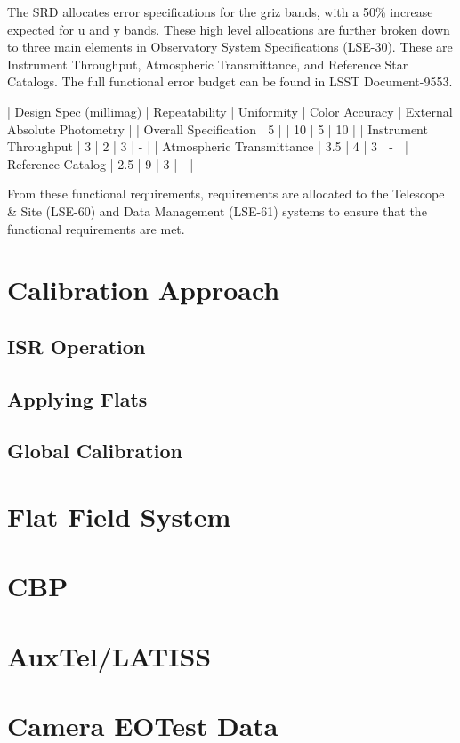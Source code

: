 \documentclass[SE,authoryear,toc]{article}
\begin{document}
The SRD allocates error specifications for the griz bands, with a 50\% increase expected for u and y bands. These high level allocations are further broken down to three main elements in Observatory System Specifications (LSE-30). These are Instrument Throughput, Atmospheric Transmittance, and Reference Star Catalogs. The full functional error budget can be found in LSST Document-9553.

\begin{table}[|||]
| Design Spec (millimag) | Repeatability | Uniformity | Color Accuracy | External Absolute Photometry |
| Overall Specification | 5 | | 10 | 5 | 10 |
| Instrument Throughput | 3 | 2 | 3 | - |
| Atmospheric Transmittance | 3.5 | 4 | 3 | - |
| Reference Catalog | 2.5 | 9 | 3 | - | 
\end{table}

From these functional requirements, requirements are allocated to the Telescope \& Site (LSE-60) and Data Management (LSE-61) systems to ensure that the functional requirements are met. 

\section{Calibration Approach}
\subsection{ISR Operation}
\subsection{Applying Flats}
\subsection{Global Calibration}

\section{Flat Field System}

\section{CBP}

\section{AuxTel/LATISS}

\section{Camera EOTest Data}
\end{document}

